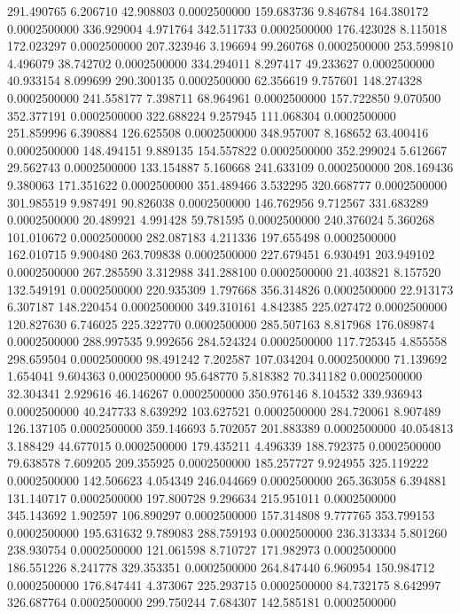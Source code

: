 291.490765 6.206710 42.908803 0.0002500000
159.683736 9.846784 164.380172 0.0002500000
336.929004 4.971764 342.511733 0.0002500000
176.423028 8.115018 172.023297 0.0002500000
207.323946 3.196694 99.260768 0.0002500000
253.599810 4.496079 38.742702 0.0002500000
334.294011 8.297417 49.233627 0.0002500000
40.933154 8.099699 290.300135 0.0002500000
62.356619 9.757601 148.274328 0.0002500000
241.558177 7.398711 68.964961 0.0002500000
157.722850 9.070500 352.377191 0.0002500000
322.688224 9.257945 111.068304 0.0002500000
251.859996 6.390884 126.625508 0.0002500000
348.957007 8.168652 63.400416 0.0002500000
148.494151 9.889135 154.557822 0.0002500000
352.299024 5.612667 29.562743 0.0002500000
133.154887 5.160668 241.633109 0.0002500000
208.169436 9.380063 171.351622 0.0002500000
351.489466 3.532295 320.668777 0.0002500000
301.985519 9.987491 90.826038 0.0002500000
146.762956 9.712567 331.683289 0.0002500000
20.489921 4.991428 59.781595 0.0002500000
240.376024 5.360268 101.010672 0.0002500000
282.087183 4.211336 197.655498 0.0002500000
162.010715 9.900480 263.709838 0.0002500000
227.679451 6.930491 203.949102 0.0002500000
267.285590 3.312988 341.288100 0.0002500000
21.403821 8.157520 132.549191 0.0002500000
220.935309 1.797668 356.314826 0.0002500000
22.913173 6.307187 148.220454 0.0002500000
349.310161 4.842385 225.027472 0.0002500000
120.827630 6.746025 225.322770 0.0002500000
285.507163 8.817968 176.089874 0.0002500000
288.997535 9.992656 284.524324 0.0002500000
117.725345 4.855558 298.659504 0.0002500000
98.491242 7.202587 107.034204 0.0002500000
71.139692 1.654041 9.604363 0.0002500000
95.648770 5.818382 70.341182 0.0002500000
32.304341 2.929616 46.146267 0.0002500000
350.976146 8.104532 339.936943 0.0002500000
40.247733 8.639292 103.627521 0.0002500000
284.720061 8.907489 126.137105 0.0002500000
359.146693 5.702057 201.883389 0.0002500000
40.054813 3.188429 44.677015 0.0002500000
179.435211 4.496339 188.792375 0.0002500000
79.638578 7.609205 209.355925 0.0002500000
185.257727 9.924955 325.119222 0.0002500000
142.506623 4.054349 246.044669 0.0002500000
265.363058 6.394881 131.140717 0.0002500000
197.800728 9.296634 215.951011 0.0002500000
345.143692 1.902597 106.890297 0.0002500000
157.314808 9.777765 353.799153 0.0002500000
195.631632 9.789083 288.759193 0.0002500000
236.313334 5.801260 238.930754 0.0002500000
121.061598 8.710727 171.982973 0.0002500000
186.551226 8.241778 329.353351 0.0002500000
264.847440 6.960954 150.984712 0.0002500000
176.847441 4.373067 225.293715 0.0002500000
84.732175 8.642997 326.687764 0.0002500000
299.750244 7.684307 142.585181 0.0002500000
